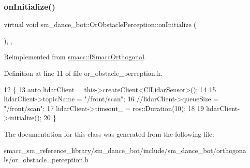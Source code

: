 \subsubsection{\texorpdfstring{on\+Initialize()}{onInitialize()}}
{\footnotesize\ttfamily virtual void sm\+\_\+dance\+\_\+bot\+::\+Or\+Obstacle\+Perception\+::on\+Initialize (\begin{DoxyParamCaption}{ }\end{DoxyParamCaption})\hspace{0.3cm}{\ttfamily [inline]}, {\ttfamily [override]}, {\ttfamily [virtual]}}



Reimplemented from \hyperlink{classsmacc_1_1ISmaccOrthogonal_a6bb31c620cb64dd7b8417f8705c79c7a}{smacc\+::\+I\+Smacc\+Orthogonal}.



Definition at line 11 of file or\+\_\+obstacle\+\_\+perception.\+h.


\begin{DoxyCode}
12     \{
13         \textcolor{keyword}{auto} lidarClient = this->createClient<ClLidarSensor>();
14 
15         lidarClient->topicName = \textcolor{stringliteral}{"/front/scan"};
16         \textcolor{comment}{//lidarClient->queueSize = "/front/scan";}
17         lidarClient->timeout\_ = ros::Duration(10);
18 
19         lidarClient->initialize();
20     \}
\end{DoxyCode}


The documentation for this class was generated from the following file\+:\begin{DoxyCompactItemize}
\item 
smacc\+\_\+sm\+\_\+reference\+\_\+library/sm\+\_\+dance\+\_\+bot/include/sm\+\_\+dance\+\_\+bot/orthogonals/\hyperlink{sm__dance__bot_2include_2sm__dance__bot_2orthogonals_2or__obstacle__perception_8h}{or\+\_\+obstacle\+\_\+perception.\+h}\end{DoxyCompactItemize}
